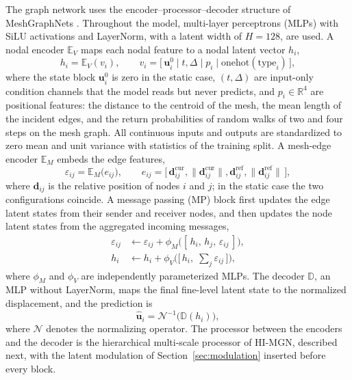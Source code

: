 \documentclass[preprint,12pt]{elsarticle}
\newcommand{\R}{\mathbb{R}}
\begin{document}
The graph network uses the encoder--processor--decoder structure of MeshGraphNets
\cite{battaglia2018relational,sanchez2020learning,pfaff2021mesh}. Throughout the model,
multi-layer perceptrons (MLPs) with SiLU activations and LayerNorm, with a latent width of
$H=128$, are used. A nodal encoder $\mathbb{E}_{V}$ maps each nodal feature to a nodal latent
vector $h_i$,
\begin{equation}
  h_i = \mathbb{E}_{V}(v_i),\qquad
  v_i = \bigl[\,\mathbf{u}^{0}_i \mid t,\Delta \mid p_i \mid \mathrm{onehot}(\text{type}_i)\,\bigr],
\end{equation}
where the state block $\mathbf{u}^{0}_i$ is zero in the static case, $(t,\Delta)$ are
input-only condition channels that the model reads but never predicts, and $p_i\in\R^{4}$ are
positional features: the distance to the centroid of the mesh, the mean length of the incident
edges, and the return probabilities of random walks of two and four steps on the mesh graph.
All continuous inputs and outputs are standardized to zero mean and unit variance with
statistics of the training split. A mesh-edge encoder $\mathbb{E}_{M}$ embeds the edge features,
\begin{equation}
  \varepsilon_{ij} = \mathbb{E}_{M}\bigl(e_{ij}\bigr),\qquad
  e_{ij} = \bigl[\,\mathbf{d}^{\text{cur}}_{ij},\|\mathbf{d}^{\text{cur}}_{ij}\|,
  \mathbf{d}^{\text{ref}}_{ij},\|\mathbf{d}^{\text{ref}}_{ij}\|\,\bigr],
\end{equation}
where $\mathbf{d}_{ij}$ is the relative position of nodes $i$ and $j$; in the static case the two
configurations coincide. A message passing (MP) block first updates the edge latent states from
their sender and receiver nodes, and then updates the node latent states from the aggregated
incoming messages,
\begin{align}
  \varepsilon_{ij} &\leftarrow \varepsilon_{ij}
    + \phi_{M}\!\big([\,h_i,\,h_j,\,\varepsilon_{ij}\,]\big),
    \label{eq:edge_update}\\[2pt]
  h_i &\leftarrow h_i
    + \phi_{V}\!\Big(\big[\,h_i,\;\textstyle\sum_j \varepsilon_{ij}\,\big]\Big),
    \label{eq:node_update}
\end{align}
where $\phi_M$ and $\phi_V$ are independently parameterized MLPs. The decoder $\mathbb{D}$, an MLP
without LayerNorm, maps the final fine-level latent state to the normalized displacement, and
the prediction is
\begin{equation}
  \hat{\mathbf{u}}_i = \mathcal{N}^{-1}\bigl(\mathbb{D}(h_i)\bigr),
\end{equation}
where $\mathcal{N}$ denotes the normalizing operator. The processor between the encoders and the
decoder is the hierarchical multi-scale processor of HI-MGN, described next, with the latent
modulation of Section~\ref{sec:modulation} inserted before every block.
\end{document}
